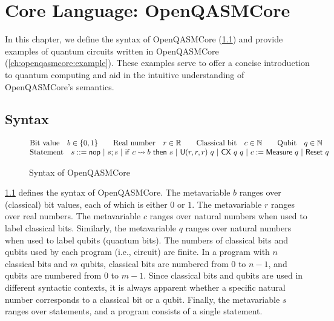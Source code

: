 
\chapter{Core Language: OpenQASMCore}
\label{ch:openqasmcore}
\noindent
In this chapter, we define the syntax of OpenQASMCore
(\cref{ch:openqasmcore:syntax}) and provide examples of quantum circuits
written in OpenQASMCore (\cref{ch:openqasmcore:example}).
%
These examples serve to offer a concise introduction to quantum computing and
aid in the intuitive understanding of OpenQASMCore's semantics.

\section{Syntax}
\label{ch:openqasmcore:syntax}

\begin{figure}[t]
	\[
		\begin{array}{@{}l}
			\text{Bit value} \quad b \in \{0,1\} \qquad
			\text{Real number} \quad r \in \mathbb{R} \qquad
			\text{Classical bit} \quad c \in \mathbb{N} \qquad
			\text{Qubit} \quad q \in \mathbb{N} \\
			\text{Statement} \quad s ::= \inop
			\ |\ \iseq{s}{s}
			\ |\ \iif{c}{b}{s}
			\ |\ \irotate{r}{r}{r}{q}
			\ |\ \icnot{q}{q}
			\ |\ \imeasure{q}{c}
			\ |\ \ireset{q}
		\end{array}
	\]
	\caption{Syntax of OpenQASMCore}
	\label{fig:syntax-openqasmcore}
\end{figure}

\noindent
\cref{fig:syntax-openqasmcore} defines the syntax of OpenQASMCore.
%
The metavariable $b$ ranges over (classical) bit values, each of which is
either $0$ or $1$.
%
The metavariable $r$ ranges over real numbers.
%
The metavariable $c$ ranges over natural numbers when used to label classical
bits.
%
Similarly, the metavariable $q$ ranges over natural numbers when used to label
qubits (quantum bits).
%
The numbers of classical bits and qubits used by each program (i.e., circuit)
are finite.
%
In a program with $n$ classical bits and $m$ qubits, classical bits are
numbered from $0$ to $n-1$, and qubits are numbered from $0$ to $m-1$.
%
Since classical bits and qubits are used in different syntactic contexts, it is
always apparent whether a specific natural number corresponds to a classical
bit or a qubit.
%
Finally, the metavariable $s$ ranges over statements, and a program consists of
a single statement.

